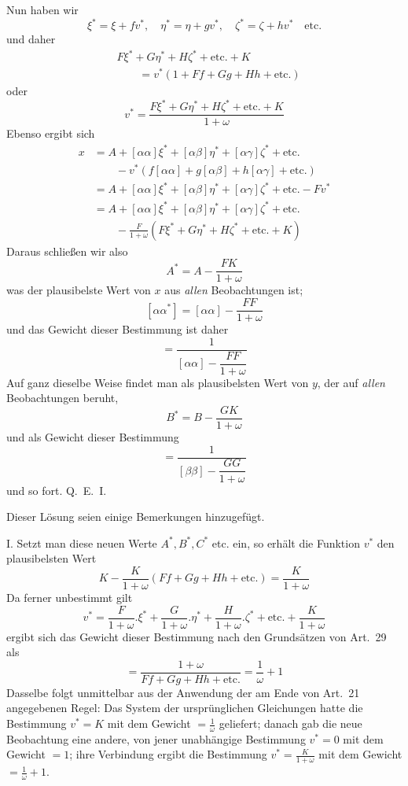 Nun haben wir
\[
\xi^*=\xi+fv^*,\quad\eta^*=\eta+gv^*,\quad\zeta^*=\zeta+hv^*\quad\text{etc.}
\]
und daher
\[
\begin{aligned}
&F\xi^*+G\eta^*+H\zeta^*+\text{etc.}+K\\
&\qquad=v^*(1+Ff+Gg+Hh+\text{etc.})
\end{aligned}
\]
oder
\[
v^*=\frac{F\xi^*+G\eta^*+H\zeta^*+\text{etc.}+K}{1+\omega}
\]
\noindent Ebenso ergibt sich
\[
\begin{aligned}
x&=A+[\alpha\alpha]\xi^*+[\alpha\beta]\eta^*+[\alpha\gamma]\zeta^*+\text{etc.}\\
&\qquad-v^*(f[\alpha\alpha]+g[\alpha\beta]+h[\alpha\gamma]+\text{etc.})\\
&=A+[\alpha\alpha]\xi^*+[\alpha\beta]\eta^*+[\alpha\gamma]\zeta^*+\text{etc.}-Fv^*\\
&=A+[\alpha\alpha]\xi^*+[\alpha\beta]\eta^*+[\alpha\gamma]\zeta^*+\text{etc.}\\
&\qquad-\frac{F}{1+\omega}(F\xi^*+G\eta^*+H\zeta^*+\text{etc.}+K)
\end{aligned}
\]
Daraus schließen wir also
\[
A^*=A-\frac{FK}{1+\omega}
\]
was der plausibelste Wert von \(x\) aus \textit{allen} Beobachtungen ist;
\[
[\alpha\alpha^*]=[\alpha\alpha]-\frac{FF}{1+\omega}
\]
und das Gewicht dieser Bestimmung ist daher
\[
=\frac1{[\alpha\alpha]-\dfrac{FF}{1+\omega}}
\]
Auf ganz dieselbe Weise findet man als plausibelsten Wert von \(y\), der auf \textit{allen} Beobachtungen beruht,
\[
B^*=B-\frac{GK}{1+\omega}
\]
und als Gewicht dieser Bestimmung
\[
=\frac1{[\beta\beta]-\dfrac{GG}{1+\omega}}
\]
und so fort. Q.\ E.\ I.

Dieser Lösung seien einige Bemerkungen hinzugefügt.

I. Setzt man diese neuen Werte \(A^*,B^*,C^*\) etc. ein, so erhält die Funktion \(v^*\) den plausibelsten Wert
\[
K-\frac{K}{1+\omega}(Ff+Gg+Hh+\text{etc.})=\frac{K}{1+\omega}
\]
Da ferner unbestimmt gilt
\[
v^*=\frac{F}{1+\omega}.\xi^*+\frac{G}{1+\omega}.\eta^*+\frac{H}{1+\omega}.\zeta^*+\text{etc.}+\frac{K}{1+\omega}
\]
%
ergibt sich das Gewicht dieser Bestimmung nach den Grundsätzen von Art.\ 29 als
\[
=\frac{1+\omega}{Ff+Gg+Hh+\text{etc.}}=\frac1\omega+1
\]
Dasselbe folgt unmittelbar aus der Anwendung der am Ende von Art.\ 21 angegebenen Regel: Das System der ursprünglichen Gleichungen hatte die Bestimmung \(v^*=K\) mit dem Gewicht \(=\frac1\omega\) geliefert; danach gab die neue Beobachtung eine andere, von jener unabhängige Bestimmung \(v^*=0\) mit dem Gewicht \(=1\); ihre Verbindung ergibt die Bestimmung \(v^*=\frac{K}{1+\omega}\) mit dem Gewicht \(=\frac1\omega+1\).

